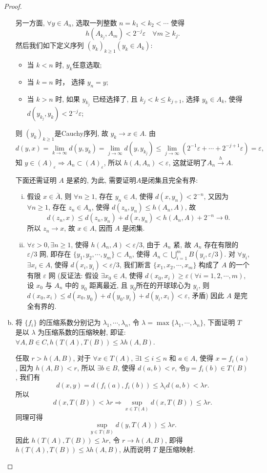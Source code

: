 \begin{proof}
\begin{enumerate}[(a)]
    另一方面, $\forall y\in A_n$, 选取一列整数 $n=k_1<k_2<\cdots$ 使得
    \[h(A_{k_j},A_m)<2^{-j}\varepsilon \quad \forall m\geq k_j.\]
    然后我们如下定义序列 $(y_k)_{k\geq 1}(y_k\in A_k)$:
    \begin{itemize}
      \item 当 $k<n$ 时, $y_k$任意选取;
      \item 当 $k=n$ 时， 选择 $y_n=y$;
      \item 当 $k>n$ 时, 如果 $y_{k_j}$ 已经选择了, 且 $k_j<k\leq k_{j+1}$,
        选择 $y_k\in A_k$, 使得 $d(y_{k_j},y_k)<2^{-j}\varepsilon$;
    \end{itemize}
    则 $(y_k)_{k\geq 1}$是Cauchy序列, 故 $y_k\rightarrow x\in A$.
    由
    \[d(y,x)=\lim_{k\to\infty}d(y,y_k)
        = \lim_{j\to\infty}d(y,y_{k_j})\leq\lim_{j\to\infty}(2^{-1}\varepsilon 
        + \cdots +2^{-j+1}\varepsilon)=\varepsilon,\]
    知 $ y\in (A)_\varepsilon\Rightarrow A_n\subset (A)_\varepsilon$,
    所以 $h(A,A_n)<\varepsilon$, 这就证明了$A_n\xrightarrow{h}A$.
    
    下面还需证明 $A$ 是紧的, 为此, 需要证明$A$是闭集且完全有界:
    \begin{enumerate}[(i)]
      \item 假设 $x\in\bar{A}$, 则 $\forall n\geq 1$, 存在 $y_n\in A$,
        使得 $d(x,y_n)<2^{-n}$, 又因为 $\forall n\geq 1$, 存在 $z_n\in A_n$,
        使得 $d(z_n,y_n)\leq h(A_n,A)$, 故
        \[d(z_n,x)\leq d(z_n,y_n)+d(x,y_n)<h(A_n,A)+2^{-n}\rightarrow 0.\]
        所以 $z_n\rightarrow x$, 故 $x\in A$, 因而 $A$ 是闭集.
      \item $\forall\varepsilon >0,\exists n\geq 1$, 使得 $h(A_n,A)<\varepsilon/3$,
        由于 $A_n$ 紧, 故 $A_n$ 存在有限的 $\varepsilon/3$ 网,
        即存在 $\{y_1,y_2,\cdots,y_m\}\subset A_n$,
        使得 $A_n\subset\bigcup_{i=1}^m B(y_i,\varepsilon/3)$.
        对 $\forall y_i$, $\exists x_i\in A$, 使得 $d(x_i,y_i)<\varepsilon/3$,
        我们断言 $\{x_1,x_2,\cdots,x_m\}$ 构成了 $A$ 的一个有限 $\varepsilon$ 网
        (反证法: 假设 $\exists x_0\in A$, 使得 $d(x_0,x_i)\geq\varepsilon(\forall i=1,2,\cdots,m)$,
        设 $x_0$ 与 $A_n$ 中的 $y_0$ 距离最近, 且 $y_0$所在的开球球心为 $y_i$,
        则 $d(x_0,x_i)\leq d(x_0,y_0)+d(y_0,y_i)+d(y_i,x_i)<\varepsilon$, 矛盾)
        因此 $A$ 是完全有界的.
    \end{enumerate}
  \item 将 $\{f_i\}$ 的压缩系数分别记为 $\lambda_1,\cdots,\lambda_n$,
    令 $\lambda=\max\{\lambda_1,\cdots,\lambda_n\}$,
    下面证明 $T$ 是以 $\lambda$ 为压缩系数的压缩映射,
    即证: $\forall A,B\in C,h(T(A),T(B))\leq\lambda h(A,B)$.

    任取 $r>h(A,B)$, 对于 $\forall x\in T(A)$, $\exists 1\leq i\leq n$ 和 $a\in A$,
    使得 $x=f_i(a)$, 因为 $h(A,B)<r$, 所以 $\exists b\in B$,
    使得 $d(a,b)<r$, 令$y=f_i(b)\in T(B)$,
    我们有
    \[d(x,y)=d(f_i(a),f_i(b))\leq\lambda_i d(a,b)<\lambda r.\]
    所以
    \[d(x,T(B))<\lambda r\Rightarrow\sup_{x\in T(A)}d(x,T(B))\leq\lambda r.\]
    同理可得
    \[\sup_{y\in T(B)}d(y,T(A))\leq\lambda r.\]
    因此 $h(T(A),T(B))\leq\lambda r$, 令 $r\to h(A,B)$,
    即得 $h(T(A),T(B))\leq\lambda h(A,B)$, 从而说明 $T$ 是压缩映射.
\end{enumerate}
\end{proof}